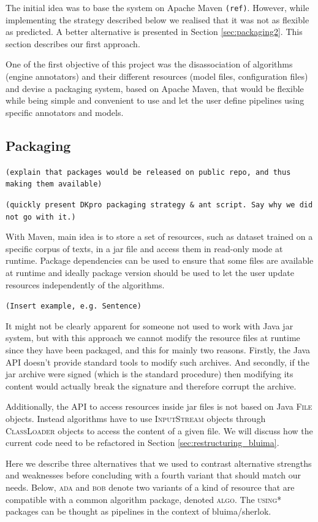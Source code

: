 \documentclass{article}
\newcommand{\ID}[1]{{\textsc{#1}}}
\newcommand{\TODO}[1]{\texttt{\textcolor{YellowOrange}{(#1)}}} %
\begin{document}
The initial idea was to base the system on Apache Maven \TODO{ref}. However, while implementing the strategy described below we realised that it was not as flexible as predicted. A better alternative is presented in Section \ref{sec:packaging2}. This section describes our first approach.

One of the first objective of this project was the disassociation of algorithms (engine annotators) and their different resources (model files, configuration files) and devise a packaging system, based on Apache Maven, that would be flexible while being simple and convenient to use and let the user define pipelines using specific annotators and models.

\subsection{Packaging}

\TODO{explain that packages would be released on public repo, and thus making them available}

\TODO{quickly present DKpro packaging strategy \& ant script. Say why we did not go with it.}

With Maven, main idea is to store a set of resources, such as dataset trained on a specific corpus of texts, in a jar file and access them in read-only mode at runtime. Package dependencies can be used to ensure that some files are available at runtime and ideally package version should be used to let the user update resources independently of the algorithms.

\TODO{Insert example, e.g. Sentence}

It might not be clearly apparent for someone not used to work with Java jar system, but with this approach we cannot modify the resource files at runtime since they have been packaged, and this for mainly two reasons. Firstly, the Java API doesn't provide standard tools to modify such archives. And secondly, if the jar archive were signed (which is the standard procedure) then modifying its content would actually break the signature and therefore corrupt the archive.

Additionally, the API to access resources inside jar files is not based on Java \ID{File} objects. Instead algorithms have to use \ID{InputStream} objects through \ID{ClassLoader} objects to access the content of a given file. We will discuss how the current code need to be refactored in Section \ref{sec:restructuring_bluima}.

Here we describe three alternatives that we used to contrast alternative strengths and weaknesses before concluding with a fourth variant that should match our needs. Below, \ID{ada} and \ID{bob} denote two variants of a kind of resource that are compatible with a common algorithm package, denoted \ID{algo}. The \ID{using*} packages can be thought as pipelines in the context of bluima/sherlok.
\end{document}
